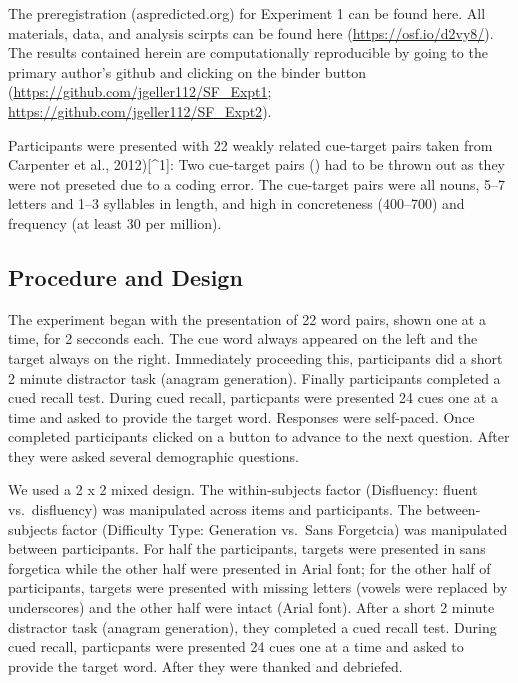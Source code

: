 \documentclass[pdf]{apa6}
\begin{document}
The preregistration (aspredicted.org) for Experiment 1 can be found here. All materials, data, and analysis scirpts can be found here (\url{https://osf.io/d2vy8/}). The results contained herein are computationally reproducible by going to the primary author's github and clicking on the binder button (\url{https://github.com/jgeller112/SF_Expt1}; \url{https://github.com/jgeller112/SF_Expt2}).

Participants were presented with 22 weakly related cue-target pairs taken from Carpenter et al., 2012){[}\^{}1{]}: Two cue-target pairs () had to be thrown out as they were not preseted due to a coding error. The cue-target pairs were all nouns, 5--7 letters and 1--3 syllables in length, and high in concreteness (400--700) and frequency (at least 30 per million).

\hypertarget{procedure-and-design}{%
\subsection{Procedure and Design}\label{procedure-and-design}}

The experiment began with the presentation of 22 word pairs, shown one at a time, for 2 secconds each. The cue word always appeared on the left and the target always on the right. Immediately proceeding this, participants did a short 2 minute distractor task (anagram generation). Finally participants completed a cued recall test. During cued recall, particpants were presented 24 cues one at a time and asked to provide the target word. Responses were self-paced. Once completed participants clicked on a button to advance to the next question. After they were asked several demographic questions.

We used a 2 x 2 mixed design. The within-subjects factor (Disfluency: fluent vs.~disfluency) was manipulated across items and participants. The between-subjects factor (Difficulty Type: Generation vs.~Sans Forgetcia) was manipulated between participants. For half the participants, targets were presented in sans forgetica while the other half were presented in Arial font; for the other half of participants, targets were presented with missing letters (vowels were replaced by underscores) and the other half were intact (Arial font). After a short 2 minute distractor task (anagram generation), they completed a cued recall test. During cued recall, particpants were presented 24 cues one at a time and asked to provide the target word. After they were thanked and debriefed.
\end{document}
